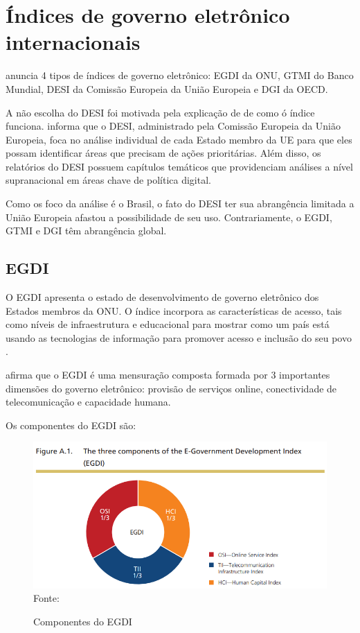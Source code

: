 \chapter{Índices de governo eletrônico internacionais}

\cite{martinez2022egovernment} anuncia 4 tipos de índices de governo eletrônico: EGDI da ONU, GTMI do Banco Mundial, DESI da Comissão Europeia da União Europeia e DGI da OECD.

A não escolha do DESI foi motivada pela explicação de \cite{desi_2022} de como ó índice funciona. \cite{desi_2022} informa que o DESI, administrado pela Comissão Europeia da União Europeia, foca no análise individual de cada Estado membro da UE para que eles possam identificar áreas que precisam de ações prioritárias. Além disso, os relatórios do DESI possuem capítulos temáticos que providenciam análises a nível supranacional em áreas chave de política digital.

Como os foco da análise é o Brasil, o fato do DESI ter sua abrangência limitada a União Europeia afastou a possibilidade de seu uso. Contrariamente, o EGDI, GTMI e DGI têm abrangência global.

\section{EGDI}

O EGDI apresenta o estado de desenvolvimento de governo eletrônico dos Estados membros da ONU. O índice incorpora as características de acesso, tais como níveis de infraestrutura e educacional para mostrar como um país está usando as tecnologias de informação para promover acesso e inclusão do seu povo \cite{ONU_EGDI}.

\cite{ONU_EGDI} afirma que o EGDI é uma mensuração composta formada por 3 importantes dimensões do governo eletrônico: provisão de serviços online, conectividade de telecomunicação e capacidade humana.

Os componentes do EGDI são:

\begin{figure}[H]
	\centering
	\caption{Componentes do EGDI}
	\includegraphics[width=1\linewidth]{figuras/egdi/egdi_componentes.png}
	\label{fig:egdi_componentes}
	\footnotesize{Fonte: \cite{ONU_EGDI_methodology}}
\end{figure}


